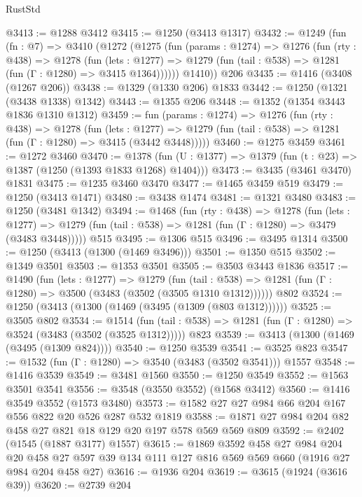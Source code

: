 \begin{lexlean}{RustStd}
\begin{coremodule}
{\begin{coremodule}
{{{{{{{{{{{{{@3413 := @1288 @3412
@3415 := @1250 (@3413 @1317)
@3432 := @1249
    (fun (fn : @7) =>
    @3410
      (@1272
        (@1275
          (fun (params : @1274) =>
          @1276
            (fun (rty : @438) =>
            @1278
              (fun (lets : @1277) =>
              @1279 (fun (tail : @538) => @1281 (fun (Γ : @1280) => @3415 @1364))))))
        @1410))
    @206
@3435 := @1416 (@3408 (@1267 @206))
@3438 := @1329 (@1330 @206) @1833
@3442 := @1250 (@1321 (@3438 @1338) @1342)
@3443 := @1355 @206
@3448 := @1352 (@1354 @3443 @1836 @1310 @1312)
@3459 := fun (params : @1274) =>
  @1276
    (fun (rty : @438) =>
    @1278
      (fun (lets : @1277) =>
      @1279 (fun (tail : @538) => @1281 (fun (Γ : @1280) => @3415 (@3442 @3448)))))
@3460 := @1275 @3459
@3461 := @1272 @3460
@3470 := @1378 (fun (U : @1377) => @1379 (fun (t : @23) => @1387 (@1250 (@1393 @1833 @1268) @1404)))
@3473 := @3435 (@3461 @3470) @1831
@3475 := @1235 @3460 @3470
@3477 := @1465 @3459 @519
@3479 := @1250 (@3413 @1471)
@3480 := @3438 @1474
@3481 := @1321 @3480
@3483 := @1250 (@3481 @1342)
@3494 := @1468
    (fun (rty : @438) =>
    @1278
      (fun (lets : @1277) =>
      @1279 (fun (tail : @538) => @1281 (fun (Γ : @1280) => @3479 (@3483 @3448)))))
    @515
@3495 := @1306 @515
@3496 := @3495 @1314
@3500 := @1250 (@3413 (@1300 (@1469 @3496)))
@3501 := @1350 @515
@3502 := @1349 @3501
@3503 := @1353 @3501
@3505 := @3503 @3443 @1836
@3517 := @1490
    (fun (lets : @1277) =>
    @1279
      (fun (tail : @538) => @1281 (fun (Γ : @1280) => @3500 (@3483 (@3502 (@3505 @1310 @1312))))))
    @802
@3524 := @1250 (@3413 (@1300 (@1469 (@3495 (@1309 (@803 @1312))))))
@3525 := @3505 @802
@3534 := @1514
    (fun (tail : @538) => @1281 (fun (Γ : @1280) => @3524 (@3483 (@3502 (@3525 @1312)))))
    @823
@3539 := @3413 (@1300 (@1469 (@3495 (@1309 @824))))
@3540 := @1250 @3539
@3541 := @3525 @823
@3547 := @1532 (fun (Γ : @1280) => @3540 (@3483 (@3502 @3541))) @1557
@3548 := @1416 @3539
@3549 := @3481 @1560
@3550 := @1250 @3549
@3552 := @1563 @3501 @3541
@3556 := @3548 (@3550 @3552) (@1568 @3412)
@3560 := @1416 @3549 @3552 (@1573 @3480)
@3573 := @1582 @27 @27 @984 @66 @204 @167 @556 @822 @20 @526 @287 @532 @1819
@3588 := @1871 @27 @984 @204 @82 @458 @27 @821 @18 @129 @20 @197 @578 @569 @569 @809
@3592 := @2402 (@1545 (@1887 @3177) @1557)
@3615 := @1869
    @3592
    @458
    @27
    @984
    @204
    @20
    @458
    @27
    @597
    @39
    @134
    @111
    @127
    @816
    @569
    @569
    @660
    (@1916 @27 @984 @204 @458 @27)
@3616 := @1936 @204
@3619 := @3615 (@1924 (@3616 @39))
@3620 := @2739 @204
}}}}}}}}}}}}}
\end{coremodule}}
\end{coremodule}
\end{lexlean}
